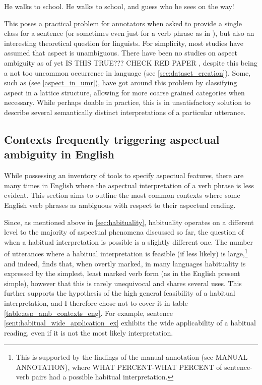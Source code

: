 \begin{exe}
    \ex He walks to school.
    \label{walktoschoolsent}
    \ex He walks to school, and guess who he sees on the way!
    \label{walktoschoolsent2}
\end{exe}

This poses a practical problem for annotators when asked to provide a single class for a sentence (or sometimes even just for a verb phrase as in \citet{siegel-mckeown-2000-learning}), but also an interesting theoretical question for linguists. For simplicity, most studies have assumed that aspect is unambiguous. There have been no studies on aspect ambiguity as of yet IS THIS TRUE??? CHECK RED PAPER \citep{friedrich-etal-2023-kind}, despite this being a not too uncommon occurrence in language (see \ref{sec:dataset_creation}). Some, such as \citet{umr} (see \ref{aspect_in_umr}), have got around this problem by classifying aspect in a lattice structure, allowing for more coarse grained categories when necessary. While perhaps doable in practice, this is in unsatisfactory solution to describe several semantically distinct interpretations of a particular utterance.

\subsection{Contexts frequently triggering aspectual ambiguity in English}
While possessing an inventory of tools to specify aspectual features, there are many times in English where the aspectual interpretation of a verb phrase is less evident. This section aims to outline the most common contexts where some English verb phrases as ambiguous with respect to their aspectual reading.

Since, as mentioned above in \ref{sec:habituality}, habituality operates on a different level to the majority of aspectual phenomena discussed so far, the question of when a habitual interpretation is possible is a slightly different one. The number of utterances where a habitual interpretation is feasible (if less likely) is large,\footnote{This is supported by the findings of the manual annotation (see MANUAL ANNOTATION), where WHAT PERCENT-WHAT PERCENT of sentence-verb pairs had a possible habitual interpretation.} and indeed, \citep{Dahl1985TenseAA} finds that, when overtly marked, in many languages habituality is expressed by the simplest, least marked verb form (as in the English present simple), however that this is rarely unequivocal and shares several uses. This further supports the hypothesis of the high general feasibility of a habitual interpretation, and I therefore chose not to cover it in table \ref{table:asp_amb_contexts_eng}. For example, sentence \ref{sent:habitual_wide_application_ex} exhibits the wide applicability of a habitual reading, even if it is not the most likely interpretation.

